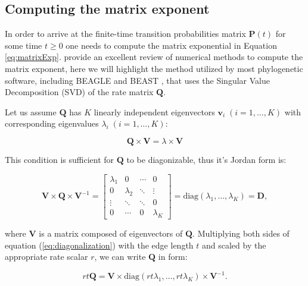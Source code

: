 \documentclass[12pt,twoside]{mitthesis}
\theoremstyle{plain}
\theoremstyle{definition}
\theoremstyle{remark}
\begin{document}
\subsection{Computing the matrix exponent \label{sub:exponentiation}}

In order to arrive at the finite-time transition probabilities matrix $\mathbf{P}(t)$ for some time $t\geq0$ one needs to compute the matrix exponential in Equation \ref{eq:matrixExp}.
\cite{Moler78nineteendubious} provide an excellent review of numerical methods to compute the matrix exponent, here we will highlight the method utilized by most phylogenetic software, including BEAGLE \citep{ayres2012beagle} and BEAST \citep{Drummond2012}, that uses the Singular Value Decomposition (SVD) of the rate matrix $\mathbf{Q}$.   

Let us assume $\mathbf{Q}$ has $K$ linearly independent eigenvectors $\mathbf{v}_{i} \; (i=1,\ldots,K)$ with corresponding eigenvalues $\lambda_{i}\;(i=1,\ldots,K)$:

\begin{equation}
\mathbf{Q}\times\mathbf{V}=\lambda\times\mathbf{V}
\label{eq:eigenvaluesEigenvectors}
\end{equation}

\noindent
This condition is sufficient for $\mathbf{Q}$ to be diagonizable, thus it's Jordan form is:

\begin{equation}
\mathbf{V}\times\mathbf{Q}\times\mathbf{V}^{-1}=\left[\begin{array}{cccc}
\lambda_{1} & 0 & \cdots & 0\\
0 & \lambda_{2} & \ddots & \vdots\\
\vdots & \ddots & \ddots & 0\\
0 & \cdots & 0 & \lambda_{K}
\end{array}\right]=\text{diag}(\lambda_{1},\ldots,\lambda_{K})=\mathbf{D} ,
\label{eq:diagonalization}
\end{equation}

\noindent where $\mathbf{V}$ is a matrix composed of eigenvectors of $\mathbf{Q}$. 
Multiplying both sides of equation (\ref{eq:diagonalization}) with the edge length $t$ and scaled by the appropriate rate scalar $r$, we can write $\mathbf{Q}$ in form:

\begin{equation}
rt\mathbf{Q}=\mathbf{V}\times\text{diag}(rt\lambda_{1},\ldots,rt\lambda_{K})\times\mathbf{V}^{-1} .
\end{equation}
\end{document}
